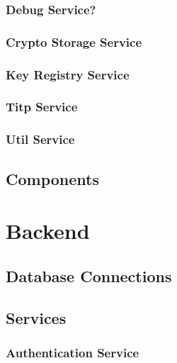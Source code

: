 
\subsubsection{Debug Service?}

\subsubsection{Crypto Storage Service}

\subsubsection{Key Registry Service}

\subsubsection{Titp Service}

\subsubsection{Util Service}

\subsection{Components}

\section{Backend}

\subsection{Database Connections}

\subsection{Services}

\subsubsection{Authentication Service}

